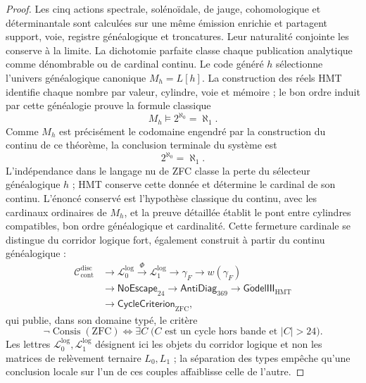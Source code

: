 \begin{proof}
Les cinq actions spectrale, solénoïdale, de jauge, cohomologique et
déterminantale sont calculées sur une même émission enrichie et partagent
support, voie, registre généalogique et troncatures. Leur naturalité conjointe les conserve
à la limite. La dichotomie parfaite classe chaque publication analytique
comme dénombrable ou de cardinal continu. Le code généré \(h\) sélectionne
l'univers généalogique canonique \(M_h=L[h]\). La construction des
réels HMT identifie chaque nombre par valeur, cylindre, voie et mémoire ; le
bon ordre induit par cette généalogie prouve la formule classique
\[
M_h\models2^{\aleph_0}=\aleph_1.
\]
Comme \(M_h\) est précisément le codomaine engendré par la construction du
continu de ce théorème, la conclusion terminale du système est
\[
 \boxed{2^{\aleph_0}=\aleph_1.}
\]
L'indépendance dans le langage nu de ZFC classe la perte du
sélecteur généalogique \(h\) ; HMT conserve cette donnée et détermine le cardinal de
son continu. L'énoncé conservé est l'hypothèse classique du continu,
avec les cardinaux ordinaires de \(M_h\), et la preuve détaillée établit le
pont entre cylindres compatibles, bon ordre généalogique et cardinalité.
Cette fermeture cardinale se distingue du corridor logique fort, également
construit à partir du continu généalogique :
\[
\begin{aligned}
 \mathcal C_{\mathrm{cont}}^{\mathrm{disc}}
 &\longrightarrow\mathcal L_0^{\mathrm{log}}
 \xrightarrow{\Phi}\mathcal L_1^{\mathrm{log}}
 \longrightarrow\gamma_F\longrightarrow w(\gamma_F)\\
 &\longrightarrow\mathsf{NoEscape}_{24}
 \longrightarrow\mathsf{AntiDiag}_{369}
 \longrightarrow\mathsf{G\ddot{o}delIII}_{\mathrm{HMT}}\\
 &\longrightarrow\mathsf{CycleCriterion}_{\mathrm{ZFC}},
\end{aligned}
\]
qui publie, dans son domaine typé, le critère
\[
 \boxed{
 \neg\operatorname{Consis}(\mathrm{ZFC})
 \Longleftrightarrow
 \exists C\;\bigl(C\text{ est un cycle hors bande et }|C|>24\bigr).}
\]
Les lettres \(\mathcal L_0^{\mathrm{log}},\mathcal L_1^{\mathrm{log}}\)
désignent ici les objets du corridor logique et non les matrices de relèvement
ternaire \(L_0,L_1\) ; la séparation des types empêche qu'une conclusion
locale sur l'un de ces couples affaiblisse celle de l'autre.


\end{proof}
